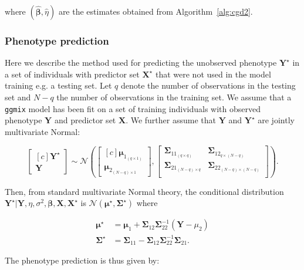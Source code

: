 \documentclass[10pt,letterpaper]{article}
\newcommand{\bX}{\textbf{X}}
\newcommand{\bY}{\textbf{Y}}
\newcommand{\bSigma}{\boldsymbol{\Sigma}}
\newcommand{\bmu}{\boldsymbol{\mu}}
\newcommand{\bbeta}{\boldsymbol{\beta}}
\begin{document}
where $(\widehat{\bbeta}, \widehat{\eta})$ are the estimates obtained from Algorithm~\ref{alg:cgd2}.



\subsubsection*{Phenotype prediction} \label{phenoprediction}

Here we describe the method used for predicting the unobserved phenotype $\bY^\star$ in a set of individuals with predictor set $\bX^\star$ that were not used in the model training e.g. a testing set. Let $q$ denote the number of observations in the testing set and $N-q$ the number of observations in the training set. We assume that a \texttt{ggmix} model has been fit on a set of training individuals with observed phenotype $\bY$ and predictor set $\bX$.  We further assume that $\bY$ and $\bY^\star$ are jointly multivariate Normal:

\begin{equation*}
\left[ \begin{matrix*}[c]
\bY^\star \\
\bY
\end{matrix*}\right] \sim \mathcal{N} \left( \left[\begin{matrix*}[c]
\bmu_{1_{(q\times 1)}} \\
\bmu_{2_{(N-q)\times 1}}
\end{matrix*}\right], \left[ \begin{matrix}
\bSigma_{11_{(q\times q)}} & \bSigma_{12_{q\times (N-q)}} \\
\bSigma_{21_{(N-q)\times q}} & \bSigma_{22_{(N-q)\times (N-q)}}  \\
\end{matrix}   \right]  \right).
\end{equation*}


Then, from standard multivariate Normal theory, the conditional distribution $\bY^\star | \bY, \eta, \sigma^2, \bbeta,\bX, \bX^\star$ is $\mathcal{N}(\bmu^\star, \bSigma^\star)$ where

\begin{align*}
\bmu^\star &= \bmu_1 + \bSigma_{12} \bSigma_{22}^{-1} (\bY - \mu_2) \\
\bSigma^\star & = \bSigma_{11} - \bSigma_{12} \bSigma_{22}^{-1} \bSigma_{21}.
\end{align*}

The phenotype prediction is thus given by:
\end{document}
